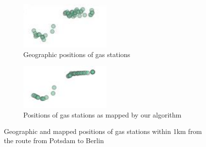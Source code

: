 \begin{figure}
\begin{subfigure}{0.49\textwidth}
    \begin{center}
    \includegraphics[width=0.5\textwidth]{img/web_app_assumption_not_mapped.jpg}
    \end{center}
  \caption{Geographic positions of gas stations}
  \label{fig:mapping:real}
\end{subfigure}
\begin{subfigure}{0.49\textwidth}
    \begin{center}
    \includegraphics[width=0.5\textwidth]{img/web_app_assumption_mapped.jpg}
    \end{center}
  \caption{Positions of gas stations as mapped by our algorithm}
  \label{fig:mapping:mapped}
\end{subfigure}
\centering
\caption{Geographic and mapped positions of gas stations within 1km from the route from Potsdam to Berlin%
}
\label{fig:mapping}
\end{figure}
